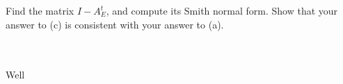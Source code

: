 Find the matrix $I-A_E^t$, and compute its Smith normal form. Show that your answer to (c) is
consistent with your answer to (a).\\\\

\begin{solution}\renewcommand{\qedsymbol}{}\ \\
    Well
\end{solution}
